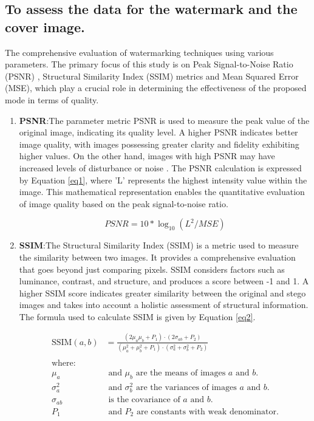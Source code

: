 \documentclass{ieeeaccess}
\begin{document}
\subsection{To assess the data for the watermark and the cover image.}

The comprehensive evaluation of watermarking techniques using various parameters. The primary focus of this study is on Peak Signal-to-Noise Ratio (PSNR) , Structural Similarity Index (SSIM) metrics and Mean Squared Error (MSE), which play a crucial role in determining the effectiveness of the proposed mode in terms of quality.
\begin{enumerate}
    \item \textbf{PSNR}:The parameter metric PSNR is used to measure the peak value of the original image, indicating its quality level. A higher PSNR indicates better image quality, with images possessing greater clarity and fidelity exhibiting higher values. On the other hand, images with high PSNR may have increased levels of disturbance or noise \cite{b35}. The PSNR calculation is expressed by Equation \ref{eq1}, where 'L' represents the highest intensity value within the image. This mathematical representation enables the quantitative evaluation of image quality based on the peak signal-to-noise ratio.

\begin{equation}
PSNR=10*\log_{10}(L^2/MSE)
\label{eq1}
\end{equation}

\item \textbf{SSIM}:The Structural Similarity Index (SSIM) is a metric used to measure the similarity between two images. It provides a comprehensive evaluation that goes beyond just comparing pixels. SSIM considers factors such as luminance, contrast, and structure, and produces a score between -1 and 1\cite{b36}. A higher SSIM score indicates greater similarity between the original and stego images and takes into account a holistic assessment of structural information. The formula used to calculate SSIM is given by Equation \ref{eq2}.

\begin{equation}
\begin{aligned}
\text{SSIM}(a, b) & = \frac{{(2 \mu_a \mu_b + P_1) \cdot (2 \sigma_{ab} + P_2)}}{{(\mu_a^2 + \mu_b^2 + P_1) \cdot (\sigma_a^2 + \sigma_b^2 + P_2)}} \\
\\
\text{where:} \\
\mu_a & \text{ and } \mu_b \text{ are the means of images } a \text{ and } b. \\
\sigma_a^2 & \text{ and } \sigma_b^2 \text{ are the variances of images } a \text{ and } b. \\
\sigma_{ab} & \text{ is the covariance of } a \text{ and } b. \\
P_1 & \text{ and } P_2 \text{ are constants with weak denominator.}
\end{aligned}
\label{eq2}
\end{equation}




\end{enumerate}
\end{document}
